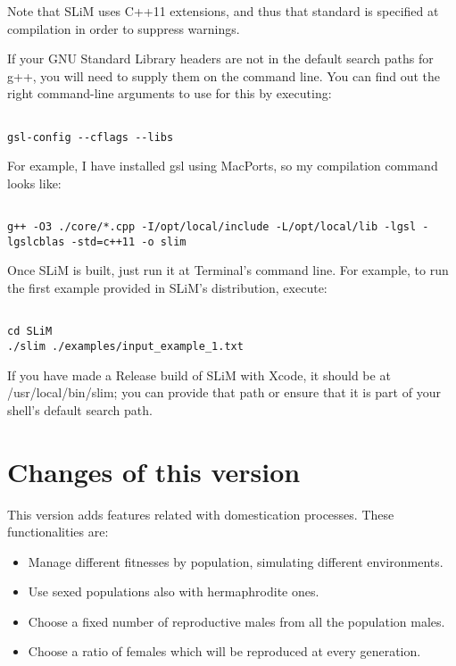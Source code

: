 \documentclass{article}
\begin{document}
Note that SLiM uses C++11 extensions, and thus that standard is specified at compilation in order to suppress warnings.

If your GNU Standard Library headers are not in the default search paths for g++, you will need to supply them on the command line. You can find out the right command-line arguments to use for this by executing:

\begin{verbatim}

gsl-config --cflags --libs

\end{verbatim}

For example, I have installed gsl using MacPorts, so my compilation command looks like:


\begin{verbatim}

g++ -O3 ./core/*.cpp -I/opt/local/include -L/opt/local/lib -lgsl -lgslcblas -std=c++11 -o slim
\end{verbatim}

Once SLiM is built, just run it at Terminal's command line. For example, to run the first example provided in SLiM's distribution, execute:


\begin{verbatim}

cd SLiM
./slim ./examples/input_example_1.txt

\end{verbatim}
If you have made a Release build of SLiM with Xcode, it should be at /usr/local/bin/slim; you can provide that path or ensure that it is part of your shell's default search path.

\section{Changes of this version}

This version adds features related with domestication processes. These functionalities are:

\begin{itemize}
 \item Manage different fitnesses by population, simulating different environments.
 \item Use sexed populations also with hermaphrodite ones.
 \item Choose a fixed number of reproductive males from all the population males.
 \item Choose a ratio of females which will be reproduced at every generation.
\end{itemize}
\end{document}
